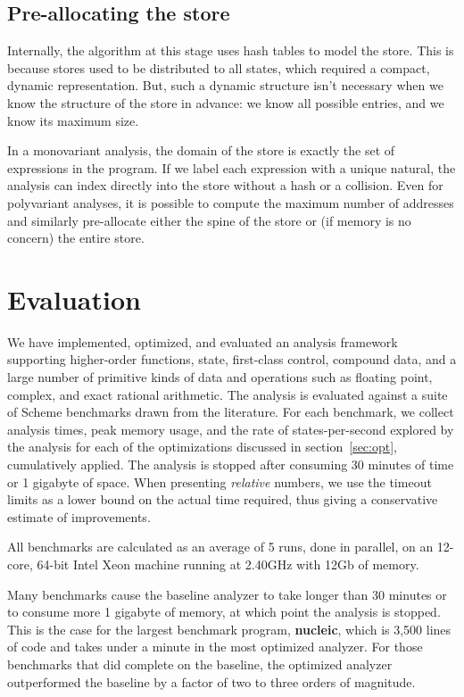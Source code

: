 \documentclass[preprint,onecolumn,9pt]{sigplanconf} %
\begin{document}
\subsection{Pre-allocating the store}

Internally, the algorithm at this stage uses hash tables to model the store.
%
This is because stores used to be distributed to all states, which
required a compact, dynamic representation.
%
But, such a dynamic structure isn't necessary when we know the
structure of the store in advance: we know all possible entries, and
we know its maximum size.

In a monovariant analysis, the domain of the store is
exactly the set of expressions in the program.
%
If we label each expression with a unique natural, the analysis can
index directly into the store without a hash or a collision.
%
Even for polyvariant analyses, it is possible to compute the maximum
number of addresses and similarly pre-allocate either the spine of the
store or (if memory is no concern) the entire store.

\section{Evaluation}
\label{sec:eval}

We have implemented, optimized, and evaluated an analysis framework
supporting higher-order functions, state, first-class control,
compound data, and a large number of primitive kinds of data and
operations such as floating point, complex, and exact rational
arithmetic.  The analysis is evaluated against a suite of Scheme benchmarks
drawn from the literature.
%
For each benchmark, we collect analysis times, peak memory usage, and
the rate of states-per-second explored by the analysis for each of the
optimizations discussed in section~\ref{sec:opt}, cumulatively
applied.  The analysis is stopped after consuming 30 minutes of time
or 1 gigabyte of space.  When presenting \emph{relative} numbers, we
use the timeout limits as a lower bound on the actual time required,
thus giving a conservative estimate of improvements.

All benchmarks are calculated as an average of 5 runs, done in
parallel, on an 12-core, 64-bit Intel Xeon machine running at 2.40GHz
with 12Gb of memory.

Many benchmarks cause the baseline analyzer to take longer than 30
minutes or to consume more 1 gigabyte of memory, at which point the
analysis is stopped.  This is the case for the largest benchmark
program, {\bf nucleic}, which is 3,500 lines of code and takes under a minute in the
most optimized analyzer.  For those benchmarks that did complete on
the baseline, the optimized analyzer outperformed the baseline by a
factor of two to three orders of magnitude.
\end{document}
